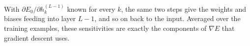 \begin{keeptogether}
With $\partial E_0 / \partial h_k^{(L-1)}$ known for every $k$, the same two steps give the weights and biases feeding into layer $L-1$, and so on back to the input. Averaged over the training examples, these sensitivities are exactly the components of $\nabla E$ that gradient descent uses.
\end{keeptogether}